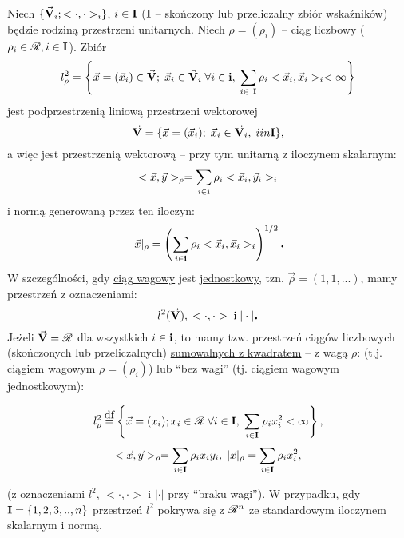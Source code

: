 \begin{example}
   Niech $\{\vec{\mathbf{V}}_i; <\cdot, \cdot>_i\}$, $i \in \mathbf{I}$ ($\mathbf{I}$ -- skończony lub przeliczalny zbiór wskaźników) będzie rodziną przestrzeni unitarnych. Niech $\rho = (\rho_i)$ -- ciąg liczbowy ($\rho_i \in \mathscr{R}, i \in \mathbf{I}$). Zbiór
   \[l^2_\rho = \left\{\vec{x} = (\vec{x}_i) \in \vec{\mathbf{V}}; \; \vec{x}_i \in \vec{\mathbf{V}}_i\; \forall i \in \mathbf{i}, \; \sum\limits_{i \in\ \mathbf{I}} \rho_i <\vec{x}_i, \vec{x}_i>_i < \infty \right\}\]
   jest podprzestrzenią liniową przestrzeni wektorowej
   \[\vec{\mathbf{V}} = \{\vec{x} = (\vec{x}_i); \; \vec{x}_i \in \vec{\mathbf{V}}_i, \; i in \mathbf{I}\},\]
   a więc jest przestrzenią wektorową -- przy tym unitarną z iloczynem skalarnym:
   \[<\vec{x}, \vec{y}>_\rho = \sum\limits_{i\in\mathbf{i}} \rho_i <\vec{x}_i, \vec{y}_i>_i\]
   i normą generowaną przez ten iloczyn:
   \[|\vec{x}|_\rho = \left( \sum\limits_{i\in\mathbf{i}} \rho_i <\vec{x}_i, \vec{x}_i>_i \right)^{1/2} \mbox{\large\bfseries .}\]
   W szczególności, gdy \underline{ciąg wagowy} jest \underline{jednostkowy}, 
   tzn. $\vec{\rho} = (1,1, ...)$, mamy przestrzeń z oznaczeniami:
   \[l^2(\vec{\mathbf{V}}), \; <\cdot, \cdot>\; \text{i}\; |\cdot| \mbox{\large\bfseries .}\]
   Jeżeli $\vec{\mathbf{V}} = \mathscr{R}$ dla wszystkich $i\in\mathbf{i}$, to mamy tzw. przestrzeń ciągów liczbowych (skończonych lub przeliczalnych) \underline{sumowalnych z kwadratem} -- z wagą $\rho$: (t.j. ciągiem wagowym $\rho = (\rho_i)$) lub ``bez wagi'' (tj. ciągiem wagowym jednostkowym):

   \[l^2_\rho \df \left\{ \vec{x} = (x_i); x_i \in\real\; \forall i \in\set{I}, \; \sum\limits_{i\in\set{I}} \rho_i x_i^2 < \infty \right\},\]
   \[ <\vec{x}, \vec{y}>_\rho = \sum\limits_{i\in\mathbf{I}} \rho_i x_i y_i, \; |\vec{x}|_\rho = \sum\limits_{i\in\mathbf{I}} \rho_i x_i^2,\]
   
   (z oznaczeniami $l^2$, $<\cdot, \cdot>$ i $|\cdot|$ przy ``braku wagi'').
   W przypadku, gdy $\mathbf{I} = \{1,2,3,..,n\}$ przestrzeń $l^2$ pokrywa się z $\mathscr{R}^n$ ze standardowym iloczynem skalarnym i normą.
\end{example}
